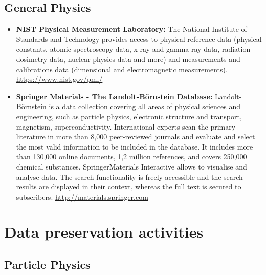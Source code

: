 \subsection{General Physics}\label{databases:subsec:genphysrep}

\begin{itemize}
\item
  \textbf{NIST Physical Measurement Laboratory:} The National Institute
  of Standards and Technology provides access to physical reference data
  (physical constants, atomic spectroscopy data, x-ray and gamma-ray
  data, radiation dosimetry data, nuclear physics data and more) and
  measurements and calibrations data (dimensional and electromagnetic
  measurements). \url{https://www.nist.gov/pml/}
\item
  \textbf{Springer Materials - The Landolt-Börnstein Database:}
  Landolt-Börnstein is a data collection covering all areas of physical
  sciences and engineering, such as particle physics, electronic
  structure and transport, magnetism, superconductivity. International
  experts scan the primary literature in more than 8,000 peer-reviewed
  journals and evaluate and select the most valid information to be
  included in the database. It includes more than 130,000 online
  documents, 1,2 million references, and covers 250,000 chemical
  substances. SpringerMaterials Interactive allows to visualise and
  analyse data. The search functionality is freely accessible and the
  search results are displayed in their context, whereas the full text
  is secured to subscribers. \url{http://materials.springer.com}
\end{itemize}

\section{Data preservation
activities}\label{databases:sec:datapresactivities}

\subsection{Particle Physics}\label{databases:subsec:presparphys1}

